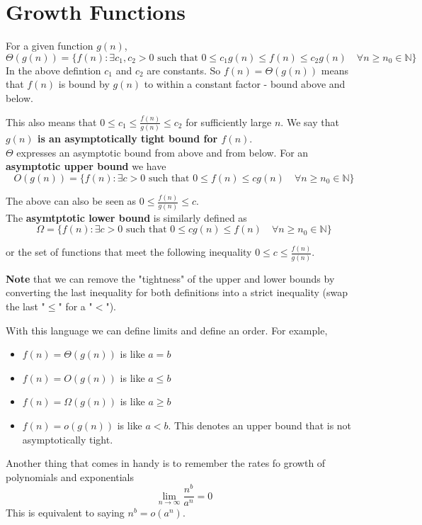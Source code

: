 \section{Growth Functions}

For a given function $g(n)$,
$$
\Theta \left( g(n) \right) =
\{ f(n) : \exists c_1, c_2 > 0 \text{ such that }
    0 \leq c_1 g(n) \leq f(n) \leq c_2 g(n) \quad \forall n \geq n_0 \in \mathbb{N}
\}
$$
In the above defintion $c_1$ and $c_2$ are constants.
So $f(n) = \Theta\left(g(n)\right)$ means that $f(n)$ is bound by $g(n)$ to within a constant factor
- bound above and below.

This also means that $0 \leq c_1 \leq \frac{f(n)}{g(n)} \leq c_2$ for sufficiently large $n$.
We say that \textbf{$g(n)$ is an asymptotically tight bound for $f(n)$}.
\\

$\Theta$ expresses an asymptotic bound from above and from below.
For an \textbf{asymptotic upper bound} we have
$$
O\left(g(n)\right) =
\{
    f(n) : \exists c > 0 \text{ such that }
    0 \leq f(n) \leq c g(n) \quad \forall n \geq n_0 \in \mathbb{N}
\}
$$

The above can also be seen as $0 \leq \frac{f(n)}{g(n)} \leq c$.
\\

The \textbf{asymtptotic lower bound} is similarly defined as
$$
\Omega = 
\{
    f(n) : \exists c > 0 \text{ such that }
    0 \leq c g(n) \leq f(n) \quad \forall n \geq n_0 \in \mathbb{N}
\}
$$

or the set of functions that meet the following inequality $0 \leq c \leq \frac{f(n)}{g(n)}$.

\textbf{Note} that we can remove the "tightness" of the upper and lower bounds by converting the
last inequality for both definitions into a strict inequality (swap the last "$\leq$" for a "$<$").

With this language we can define limits and define an order.
For example,
\begin{itemize}
    \item $f(n) = \Theta (g(n))$ is like $a = b$
    \item $f(n) = O(g(n))$ is like $a \leq b$
    \item $f(n) = \Omega (g(n))$ is like $a \geq b$
    \item $f(n) = o(g(n))$ is like $a < b$. This denotes an upper bound that is not asymptotically tight.
\end{itemize}

Another thing that comes in handy is to remember the rates fo growth of polynomials and exponentials
$$
\lim_{n\rightarrow\infty} \frac{n^b}{a^n} = 0
$$
This is equivalent to saying $n^b = o(a^n)$.
\\~\\

